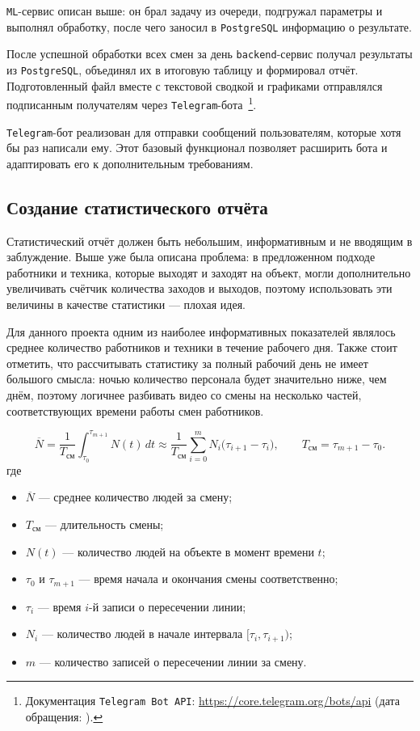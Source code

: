 \texttt{ML}-сервис описан выше: он брал задачу из очереди,
подгружал параметры и выполнял обработку, после чего заносил в \texttt{PostgreSQL} информацию о результате.

После успешной обработки всех смен за день \texttt{backend}-сервис получал результаты из
\texttt{PostgreSQL}, объединял их в итоговую таблицу и формировал отчёт. Подготовленный
файл вместе с текстовой сводкой и графиками отправлялся подписанным получателям
через \texttt{Telegram}-бота~\footnote{Документация \texttt{Telegram Bot API}: \url{https://core.telegram.org/bots/api} (дата обращения: ).}.

\texttt{Telegram}-бот реализован для отправки сообщений пользователям, которые хотя бы раз написали ему.
Этот базовый функционал позволяет расширить бота и адаптировать его к дополнительным требованиям.

\subsection{Создание статистического отчёта}
\label{subsec:creating_report}

Статистический отчёт должен быть небольшим, информативным и не вводящим в заблуждение.
Выше уже была описана проблема: в предложенном подходе работники и техника,
которые выходят и заходят на объект, могли дополнительно увеличивать счётчик количества заходов и выходов,
поэтому использовать эти величины в качестве статистики --- плохая идея.

Для данного проекта одним из наиболее информативных показателей являлось среднее количество работников и техники в течение рабочего дня. Также стоит отметить,
что рассчитывать статистику за полный рабочий день не имеет большого смысла: ночью количество персонала будет значительно ниже, чем днём,
поэтому логичнее разбивать видео со смены на несколько частей, соответствующих времени работы смен работников.

\[
    \overline{N} = \frac{1}{T_{\text{см}}}\int_{\tau_0}^{\tau_{m+1}} N(t)\,dt
    \approx \frac{1}{T_{\text{см}}}\sum_{i=0}^{m} N_i\bigl(\tau_{i+1}-\tau_i\bigr),
    \qquad T_{\text{см}} = \tau_{m+1}-\tau_0.
\]
где
\begin{itemize}
    \item $\overline{N}$ --- среднее количество людей за смену;
    \item $T_{\text{см}}$ --- длительность смены;
    \item $N(t)$ --- количество людей на объекте в момент времени $t$;
    \item $\tau_0$ и $\tau_{m+1}$ --- время начала и окончания смены соответственно;
    \item $\tau_i$ --- время $i$-й записи о пересечении линии;
    \item $N_i$ --- количество людей в начале интервала $[\tau_i, \tau_{i+1})$;
    \item $m$ --- количество записей о пересечении линии за смену.
\end{itemize}

